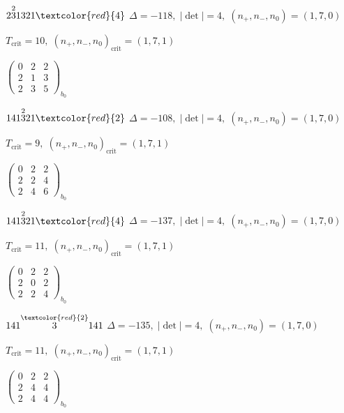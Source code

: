 \documentclass[10pt]{article}
\begin{document}
$2\overset{2}{3}1321\textcolor{red}{4}$ \quad $\Delta=-118,\; |\det|=4,\; (n_+,n_-,n_0)=(1,7,0)$

\hspace{1em}$T_{\text{crit}}=10,\; (n_+,n_-,n_0)_{\text{crit}}=(1,7,1)$

\hspace{2em}$\left(\begin{smallmatrix}0 & 2 & 2 \\ 2 & 1 & 3 \\ 2 & 3 & 5\end{smallmatrix}\right)_{\!b_0}$

\smallskip

$141\overset{2}{3}21\textcolor{red}{2}$ \quad $\Delta=-108,\; |\det|=4,\; (n_+,n_-,n_0)=(1,7,0)$

\hspace{1em}$T_{\text{crit}}=9,\; (n_+,n_-,n_0)_{\text{crit}}=(1,7,1)$

\hspace{2em}$\left(\begin{smallmatrix}0 & 2 & 2 \\ 2 & 2 & 4 \\ 2 & 4 & 6\end{smallmatrix}\right)_{\!b_0}$

$141\overset{2}{3}21\textcolor{red}{4}$ \quad $\Delta=-137,\; |\det|=4,\; (n_+,n_-,n_0)=(1,7,0)$

\hspace{1em}$T_{\text{crit}}=11,\; (n_+,n_-,n_0)_{\text{crit}}=(1,7,1)$

\hspace{2em}$\left(\begin{smallmatrix}0 & 2 & 2 \\ 2 & 0 & 2 \\ 2 & 2 & 4\end{smallmatrix}\right)_{\!b_0}$

\smallskip

$141\overset{\textcolor{red}{2}}{3}141$ \quad $\Delta=-135,\; |\det|=4,\; (n_+,n_-,n_0)=(1,7,0)$

\hspace{1em}$T_{\text{crit}}=11,\; (n_+,n_-,n_0)_{\text{crit}}=(1,7,1)$

\hspace{2em}$\left(\begin{smallmatrix}0 & 2 & 2 \\ 2 & 4 & 4 \\ 2 & 4 & 4\end{smallmatrix}\right)_{\!b_0}$
\end{document}
